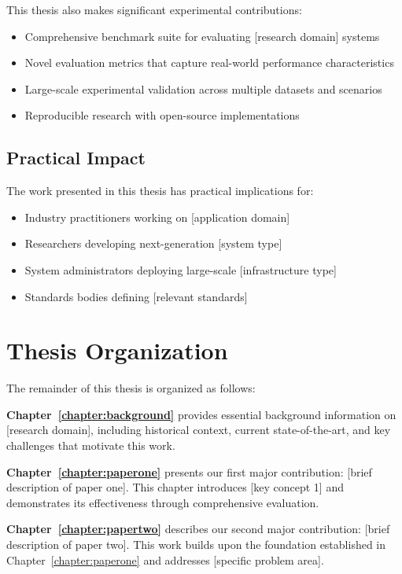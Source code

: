 This thesis also makes significant experimental contributions:
\begin{itemize}
    \item Comprehensive benchmark suite for evaluating [research domain] systems
    \item Novel evaluation metrics that capture real-world performance characteristics
    \item Large-scale experimental validation across multiple datasets and scenarios
    \item Reproducible research with open-source implementations
\end{itemize}

\subsection{Practical Impact}

The work presented in this thesis has practical implications for:
\begin{itemize}
    \item Industry practitioners working on [application domain]
    \item Researchers developing next-generation [system type]
    \item System administrators deploying large-scale [infrastructure type]
    \item Standards bodies defining [relevant standards]
\end{itemize}

\section{Thesis Organization}

The remainder of this thesis is organized as follows:

\textbf{Chapter~\ref{chapter:background}} provides essential background information on [research domain], including historical context, current state-of-the-art, and key challenges that motivate this work.

\textbf{Chapter~\ref{chapter:paperone}} presents our first major contribution: [brief description of paper one]. This chapter introduces [key concept 1] and demonstrates its effectiveness through comprehensive evaluation.

\textbf{Chapter~\ref{chapter:papertwo}} describes our second major contribution: [brief description of paper two]. This work builds upon the foundation established in Chapter~\ref{chapter:paperone} and addresses [specific problem area].

